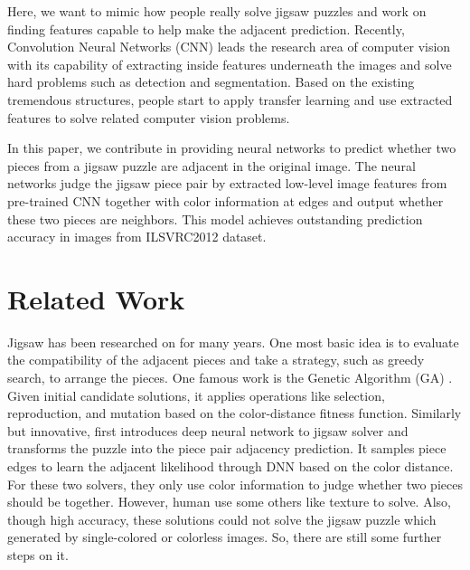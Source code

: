 \documentclass{article}
\begin{document}
Here, we want to mimic how people really solve jigsaw puzzles and work on finding features capable to help make the adjacent prediction. Recently, Convolution Neural Networks (CNN) leads the research area of computer vision with its capability of extracting inside features underneath the images and solve hard problems such as detection\cite{redmon2017yolo9000} and segmentation\cite{he2017mask,yu2015multi}. Based on the existing tremendous structures, people start to apply transfer learning and use extracted features to solve related computer vision problems\cite{razavian2014cnn}.

In this paper, we contribute in providing neural networks to predict whether two pieces from a jigsaw puzzle are adjacent in the original image. The neural networks judge the jigsaw piece pair by extracted low-level image features from pre-trained CNN together with color information at edges and output whether these two pieces are neighbors. This model achieves outstanding prediction accuracy in images from ILSVRC2012 dataset\cite{ILSVRC15}.

\section{Related Work}

Jigsaw has been researched on for many years. One most basic idea is to evaluate the compatibility of the adjacent pieces and take a strategy, such as greedy search, to arrange the pieces. One famous work is the Genetic Algorithm (GA) \cite{sholomon2013genetic}. Given initial candidate solutions, it applies operations like selection, reproduction, and mutation based on the color-distance fitness function. Similarly but innovative, \cite{sholomon2016dnn} first introduces deep neural network to jigsaw solver and transforms the puzzle into the piece pair adjacency prediction. It samples piece edges to learn the adjacent likelihood through DNN based on the color distance. For these two solvers, they only use color information to judge whether two pieces should be together. However, human use some others like texture to solve. Also, though high accuracy, these solutions could not solve the jigsaw puzzle which generated by single-colored or colorless images. So, there are still some further steps on it.
\end{document}
